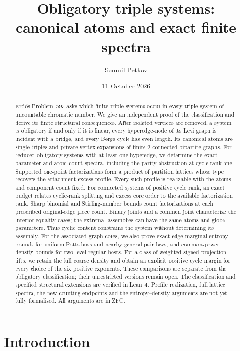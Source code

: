 \documentclass[a4paper,11pt,reqno]{amsart}
\title[Obligatory triple systems]{Obligatory triple systems: canonical atoms and exact finite spectra}
\author{Samuil Petkov}
\date{11 October 2026}
\theoremstyle{plain}
\theoremstyle{definition}
\theoremstyle{remark}
\begin{document}
\begin{abstract}
Erdős Problem~593 asks which finite triple systems occur in every triple
system of uncountable chromatic number.  We give an independent proof of the
classification and derive its finite structural consequences.  After
isolated vertices are removed, a system is obligatory if and only if it is
linear, every hyperedge-node of its Levi graph is incident with a bridge,
and every Berge cycle has even length.  Its canonical atoms are single
triples and private-vertex expansions of finite $2$-connected bipartite
graphs.  For reduced obligatory systems with at least one hyperedge, we
determine the exact parameter and atom-count spectra, including the parity
obstruction at cycle rank one.  Supported one-point factorizations form a
product of partition lattices whose type recovers the attachment excess
profile.  Every such profile is realizable with the atoms and component
count fixed.  For connected systems of positive cycle rank, an exact budget
relates cyclic-rank splitting and excess core order to the available
factorization rank.  Sharp binomial and Stirling-number bounds count
factorizations at each prescribed original-edge piece count.  Binary joints
and a common joint characterize the interior equality cases; the extremal
assemblies can have the same atoms and global parameters.  Thus cyclic
content constrains the system without determining its assembly.  For the
associated graph cores, we also prove
exact edge-marginal entropy bounds for uniform Potts laws and nearby general
pair laws, and common-power density bounds for two-level regular hosts.
For a class of weighted signed projection lifts, we retain the full coarse
density and obtain an explicit positive cycle margin for every choice of
the six positive exponents.  These comparisons are separate from the
obligatory classification; their unrestricted versions remain open.
The classification and specified structural extensions are verified in Lean~4.
Profile realization, full lattice spectra, the new counting endpoints and
the entropy--density arguments are not yet fully formalized.
All arguments are in ZFC.
\end{abstract}

\maketitle

\section*{Introduction}\label{introduction}
\end{document}
